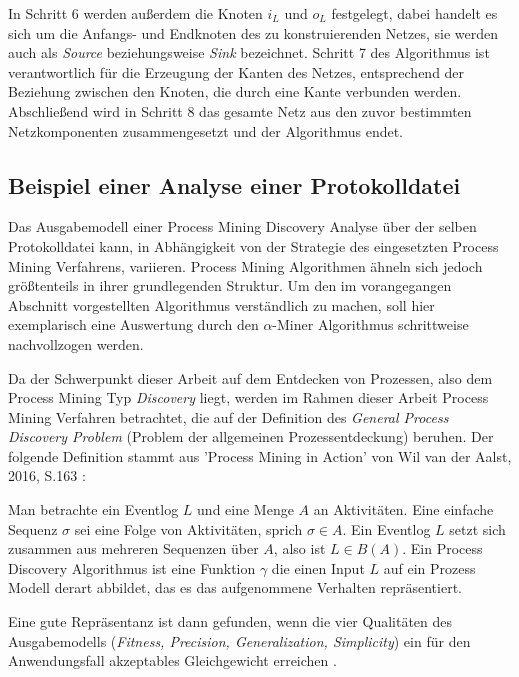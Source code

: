In Schritt 6 werden außerdem die Knoten $i_L$ und $o_L$ festgelegt, dabei handelt es sich um die Anfangs- und Endknoten des zu konstruierenden Netzes, sie werden auch als \textit{Source} beziehungsweise \textit{Sink} bezeichnet. Schritt 7 des Algorithmus ist verantwortlich für die Erzeugung der Kanten des Netzes, entsprechend der Beziehung zwischen den Knoten, die durch eine Kante verbunden werden. Abschließend wird in Schritt 8 das gesamte Netz aus den zuvor bestimmten Netzkomponenten zusammengesetzt und der Algorithmus endet.
\newpage
\subsection{Beispiel einer Analyse einer Protokolldatei}
Das Ausgabemodell einer Process Mining Discovery Analyse über der selben Protokolldatei kann, in Abhängigkeit von der Strategie des eingesetzten Process Mining Verfahrens, variieren. Process Mining Algorithmen ähneln sich jedoch größtenteils in ihrer grundlegenden Struktur. Um den im vorangegangen Abschnitt vorgestellten Algorithmus verständlich zu machen, soll hier exemplarisch eine Auswertung durch den $\alpha$-Miner Algorithmus schrittweise nachvollzogen werden.

Da der Schwerpunkt dieser Arbeit auf dem Entdecken von Prozessen, also dem Process Mining Typ \textit{ Discovery} liegt, werden im Rahmen dieser Arbeit Process Mining Verfahren betrachtet, die auf der Definition des \textit{General Process Discovery Problem} (Problem der allgemeinen Prozessentdeckung) beruhen. Der folgende Definition stammt aus 'Process Mining in Action' von Wil van der Aalst, 2016, S.163 \cite{PMinAction}:
\begin{addmargin}[20pt]{20pt} 
Man betrachte ein Eventlog $L$ und eine Menge $A$ an Aktivitäten. Eine einfache Sequenz $\sigma$ sei eine Folge von Aktivitäten, sprich $\sigma ∈ A $. Ein Eventlog $L$ setzt sich zusammen aus mehreren Sequenzen über $A$, also ist $L ∈ B(A)$. Ein Process Discovery Algorithmus ist eine Funktion $\gamma$ die einen Input $L$ auf ein Prozess Modell derart abbildet, das es das aufgenommene Verhalten repräsentiert.
\end{addmargin}
Eine gute Repräsentanz ist dann gefunden, wenn die vier Qualitäten des Ausgabemodells (\textit{Fitness, Precision, Generalization, Simplicity}) ein für den Anwendungsfall akzeptables Gleichgewicht erreichen \cite{PMinAction}.

